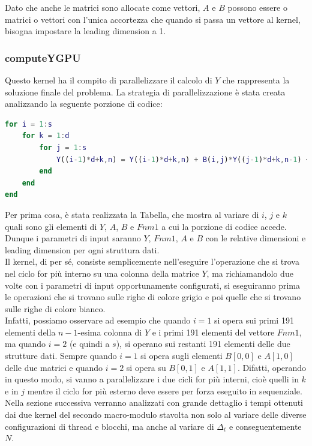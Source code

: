 \noindent Dato che anche le matrici sono allocate come vettori, $A$ e $B$ possono essere o matrici o vettori con l'unica accortezza che quando si passa un vettore al kernel, bisogna impostare la leading dimension a 1.

\subsubsection{computeYGPU}
\noindent Questo kernel ha il compito di parallelizzare il calcolo di $Y$ che rappresenta la soluzione finale del problema. La strategia di parallelizzazione è stata creata analizzando la seguente porzione di codice:

\begin{lstlisting}[language=Matlab]
for i = 1:s
    for k = 1:d
        for j = 1:s
            Y((i-1)*d+k,n) = Y((i-1)*d+k,n) + B(i,j)*Y((j-1)*d+k,n-1) + h*A(i,j)*Fnm1((j-1)*d+k);
        end
    end
end
\end{lstlisting}

\noindent Per prima cosa, è stata realizzata la Tabella, che mostra al variare di $i$, $j$ e $k$ quali sono gli elementi di $Y$, $A$, $B$ e $Fnm1$ a cui la porzione di codice accede. Dunque i parametri di input saranno $Y$, $Fnm1$, $A$ e $B$ con le relative dimensioni e leading dimension per ogni struttura dati.\\ 
Il kernel, di per sé, consiste semplicemente nell'eseguire l'operazione che si trova nel ciclo for più interno su una colonna della matrice $Y$, ma richiamandolo due volte con i parametri di input opportunamente configurati, si eseguiranno prima le operazioni che si trovano sulle righe di colore grigio e poi quelle che si trovano sulle righe di colore bianco. \\
Infatti, possiamo osservare ad esempio che quando $i = 1$ si opera sui primi 191 elementi della $n-1$-esima colonna di $Y$ e i primi 191 elementi del vettore $Fnm1$, ma quando $i = 2$ (e quindi a $s$), si operano sui restanti 191 elementi delle due strutture dati. Sempre quando $i = 1$ si opera sugli elementi $B[0, 0]$ e $A[1, 0]$ delle due matrici e quando $i = 2$ si opera su $B[0, 1]$ e $A[1, 1]$. Difatti, operando in questo modo, si vanno a parallelizzare i due cicli for più interni, cioè quelli in $k$ e in $j$ mentre il ciclo for più esterno deve essere per forza eseguito in sequenziale. \\
Nella sezione successiva verranno analizzati con grande dettaglio i tempi ottenuti dai due kernel del secondo macro-modulo stavolta non solo al variare delle diverse configurazioni di thread e blocchi, ma anche al variare di $\Delta _t$ e conseguentemente $N$.
